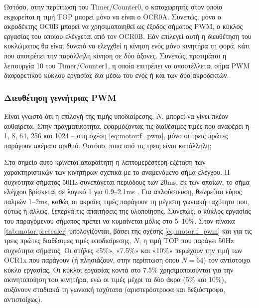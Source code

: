 Ωστόσο, στην περίπτωση του \textenglish{Timer\slash Counter0}, ο καταχωρητής
στον οποίο εκχωρείται η τιμή TOP μπορεί μόνο να είναι ο OCR0A. Συνεπώς, μόνο ο
ακροδέκτης OC0B μπορεί να χρησιμοποιηθεί ως έξοδος σήματος PWM, ο κύκλος
εργασίας του οποίου ελέγχεται από τον OCR0B. Εάν επιλεγεί αυτή η διευθέτηση του
κυκλώματος θα είναι δυνατό να ελεγχθεί η κίνηση ενός μόνο κινητήρα τη φορά,
κάτι που αποτρέπει την παράλληλη κίνηση σε δύο άξονες. Συνεπώς, προτιμάται η
λειτουργία 10 του \textenglish{Timer\slash Counter1}, η οποία επιτρέπει να
αποστέλλεται σήμα PWM διαφορετικού κύκλου εργασίας δια μέσω του ενός ή και των
δύο ακροδεκτών.


\subsubsection{Διευθέτηση γεννήτριας PWM}

Είναι γνωστό ότι η επιλογή της τιμής υποδιαίρεσης, $N$, μπορεί να γίνει πλέον
αυθαίρετα. Στην πραγματικότητα, εφαρμόζοντας τις διαθέσιμες τιμές που αναφέρει η
\textcite[109]{atmel13} -- 1, 8, 64, 256 και 1024 -- στη σχέση
\eqref{eq:motor:f_pwm}, μόνο οι τρεις πρώτες παράγουν ακέραιο αριθμό. Ωστόσο,
ποια από τις τρεις είναι κατάλληλη;

Στο σημείο αυτό κρίνεται απαραίτητη η λεπτομερέστερη εξέταση των χαρακτηριστικών
των κινητήρων σχετικά με το αναμενόμενο σήμα ελέγχου. Η συχνότητα σήματος 50Hz
συνεπάγεται περιόδους των 20ms, εκ των οποίων, το σήμα ελέγχου βρίσκεται σε
λογικό 1 για 0.9--2.1ms \parencite{hitec02}. Για απλούστευση, θεωρείται εύρος
παλμών 1--2ms, καθώς οι ακραίες τιμές παράγουν τη μέγιστη γωνιακή ταχύτητα που,
ούτως ή άλλως, ξεπερνά τις απαιτήσεις της υλοποίησης. Συνεπώς, ο κύκλος εργασίας
του παραγόμενου σήματος πρέπει να κυμαίνεται μόλις στο 5--10\%. Στον πίνακα
\ref{tab:motor:prescaler} υπολογίζονται, βάσει της σχέσης \eqref{eq:motor:f_pwm}
και για τις τρεις πρώτες διαθέσιμες τιμές υποδιαίρεσης, $N$, η τιμή TOP που
παράγει 50Hz συχνότητα σήματος. Οι στήλες «5\%», «7.5\%» και «10\%» περιέχουν
την τιμή των OCR1x που παράγουν (ή πλησιάζουν, στην περίπτωση όπου $N = 64$) τον
αντίστοιχο κύκλο εργασίας. Οι κύκλοι εργασίας κοντά στο 7.5\% χρησιμοποιούνται
για την ακινητοποίηση του κινητήρα, ενώ οι τιμές μέχρι τα δύο άκρα (5\% και
10\%), αυξάνουν σταδιακά τη γωνιακή ταχύτατα (αριστερόστροφα και δεξιόστροφα,
αντιστοίχως).

